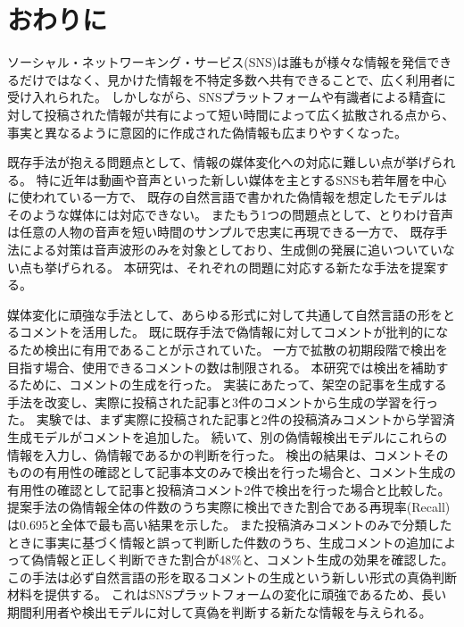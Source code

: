 \chapter{おわりに}\label{ch:conclusion}
ソーシャル・ネットワーキング・サービス(SNS)は誰もが様々な情報を発信できるだけではなく、見かけた情報を不特定多数へ共有できることで、広く利用者に受け入れられた。
しかしながら、SNSプラットフォームや有識者による精査に対して投稿された情報が共有によって短い時間によって広く拡散される点から、事実と異なるように意図的に作成された偽情報も広まりやすくなった。

既存手法が抱える問題点として、情報の媒体変化への対応に難しい点が挙げられる。
特に近年は動画や音声といった新しい媒体を主とするSNSも若年層を中心に使われている一方で、
既存の自然言語で書かれた偽情報を想定したモデルはそのような媒体には対応できない。
またもう1つの問題点として、とりわけ音声は任意の人物の音声を短い時間のサンプルで忠実に再現できる一方で、
既存手法による対策は音声波形のみを対象としており、生成側の発展に追いついていない点も挙げられる。
本研究は、それぞれの問題に対応する新たな手法を提案する。

媒体変化に頑強な手法として、あらゆる形式に対して共通して自然言語の形をとるコメントを活用した。
既に既存手法で偽情報に対してコメントが批判的になるため検出に有用であることが示されていた。
一方で拡散の初期段階で検出を目指す場合、使用できるコメントの数は制限される。
本研究では検出を補助するために、コメントの生成を行った。
実装にあたって、架空の記事を生成する手法を改変し、実際に投稿された記事と3件のコメントから生成の学習を行った。
実験では、まず実際に投稿された記事と2件の投稿済みコメントから学習済生成モデルがコメントを追加した。
続いて、別の偽情報検出モデルにこれらの情報を入力し、偽情報であるかの判断を行った。
検出の結果は、コメントそのものの有用性の確認として記事本文のみで検出を行った場合と、コメント生成の有用性の確認として記事と投稿済コメント2件で検出を行った場合と比較した。
提案手法の偽情報全体の件数のうち実際に検出できた割合である再現率(Recall)は0.695と全体で最も高い結果を示した。
また投稿済みコメントのみで分類したときに事実に基づく情報と誤って判断した件数のうち、生成コメントの追加によって偽情報と正しく判断できた割合が48\%と、コメント生成の効果を確認した。
この手法は必ず自然言語の形を取るコメントの生成という新しい形式の真偽判断材料を提供する。
これはSNSプラットフォームの変化に頑強であるため、長い期間利用者や検出モデルに対して真偽を判断する新たな情報を与えられる。

